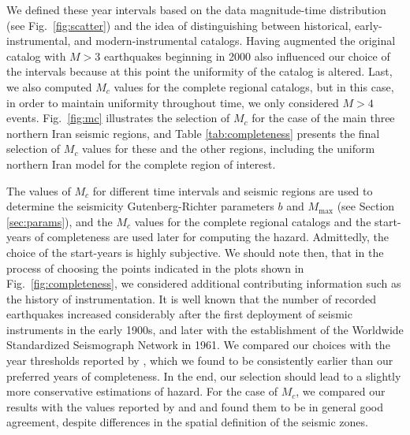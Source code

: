 {We defined these year intervals based on the data magnitude-time distribution (see Fig.~\ref{fig:scatter}) and the idea of distinguishing between historical, early-instrumental, and modern-instrumental catalogs. Having augmented the original catalog with $M>3$ earthquakes beginning in 2000 also influenced our choice of the intervals because at this point the uniformity of the catalog is altered. Last, we also computed $M_c$ values for the complete regional catalogs, but in this case, in order to maintain uniformity throughout time, we only considered $M>4$ events. Fig.~\ref{fig:mc} illustrates the selection of $M_c$ for the case of the main three northern Iran seismic regions, and Table \ref{tab:completeness} presents the final selection of $M_c$ values for these and the other regions, including the uniform northern Iran model for the complete region of interest.

The values of $M_c$ for different time intervals and seismic regions are used to determine the seismicity Gutenberg-Richter parameters $b$ and $M_{\max}$ (see Section \ref{sec:params}), and the $M_c$ values for the complete regional catalogs and the start-years of completeness are used later for computing the hazard. Admittedly, the choice of the start-years is highly subjective. We should note then, that in the process of choosing the points indicated in the plots shown in Fig.~\ref{fig:completeness}, we considered additional contributing information such as the history of instrumentation. It is well known that the number of recorded earthquakes increased considerably after the first deployment of seismic instruments in the early 1900s, and later with the establishment of the Worldwide Standardized Seismograph Network in 1961. We compared our choices with the year thresholds reported by \citet{Zare2014}, which we found to be consistently earlier than our preferred years of completeness. In the end, our selection should lead to a slightly more conservative estimations of hazard. For the case of $M_c$, we compared our results with the values reported by \citet{Karimiparidari2013} and \citet{Khodaverdian_2016_BSSA} and found them to be in general good agreement, despite differences in the spatial definition of the seismic zones.

}
